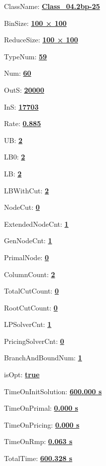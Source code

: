 \documentclass[11pt]{article}
\begin{document}
\pagestyle{empty}


ClassName: \underline{\textbf{Class_04.2bp-25}}
\par
BinSize: \underline{\textbf{100 × 100}}
\par
ReduceSize: \underline{\textbf{100 × 100}}
\par
TypeNum: \underline{\textbf{59}}
\par
Num: \underline{\textbf{60}}
\par
OutS: \underline{\textbf{20000}}
\par
InS: \underline{\textbf{17703}}
\par
Rate: \underline{\textbf{0.885}}
\par
UB: \underline{\textbf{2}}
\par
LB0: \underline{\textbf{2}}
\par
LB: \underline{\textbf{2}}
\par
LBWithCut: \underline{\textbf{2}}
\par
NodeCut: \underline{\textbf{0}}
\par
ExtendedNodeCnt: \underline{\textbf{1}}
\par
GenNodeCnt: \underline{\textbf{1}}
\par
PrimalNode: \underline{\textbf{0}}
\par
ColumnCount: \underline{\textbf{2}}
\par
TotalCutCount: \underline{\textbf{0}}
\par
RootCutCount: \underline{\textbf{0}}
\par
LPSolverCnt: \underline{\textbf{1}}
\par
PricingSolverCnt: \underline{\textbf{0}}
\par
BranchAndBoundNum: \underline{\textbf{1}}
\par
isOpt: \underline{\textbf{true}}
\par
TimeOnInitSolution: \underline{\textbf{600.000 s}}
\par
TimeOnPrimal: \underline{\textbf{0.000 s}}
\par
TimeOnPricing: \underline{\textbf{0.000 s}}
\par
TimeOnRmp: \underline{\textbf{0.063 s}}
\par
TotalTime: \underline{\textbf{600.328 s}}
\par
\newpage
\end{document}
